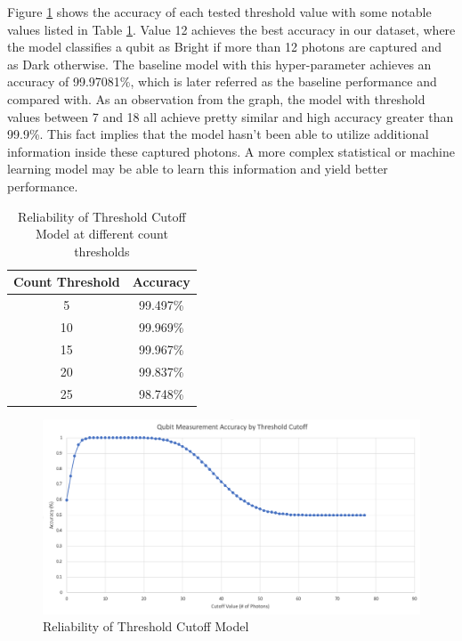 \documentclass[letterpaper,twocolumn,10pt]{article}
\begin{document}
Figure \ref{fig:threshold_cutoff} shows the accuracy of each tested threshold value with some notable values listed in Table \ref{table:threshold_cutoff}. Value 12 achieves the best accuracy in our dataset, where the model classifies a qubit as Bright if more than 12 photons are captured and as Dark otherwise. The baseline model with this hyper-parameter achieves an accuracy of 99.97081\%, which is later referred as the baseline performance and compared with. As an observation from the graph, the model with threshold values between 7 and 18 all achieve pretty similar and high accuracy greater than 99.9\%. This fact implies that the model hasn't been able to utilize additional information inside these captured photons. A more complex statistical or machine learning model may be able to learn this information and yield better performance. 

\begin{table}
    \caption{Reliability of Threshold Cutoff Model at different count thresholds}
    \begin{center}
        \begin{tabular}{c c}
            Count Threshold & Accuracy \\ [0.5ex] 
            \hline
            5 & 99.497\% \\ 
            10 & 99.969\% \\
            15 & 99.967\% \\
            20 & 99.837\% \\
            25 & 98.748\% \\
       \end{tabular}
    \end{center}
    \label{table:threshold_cutoff}  
\end{table}


\begin{figure}
    \includegraphics[width=\linewidth]{Figures/threshold_cutoff_accuracy.png}
    \centering
    \caption{Reliability of Threshold Cutoff Model}
    \label{fig:threshold_cutoff}
\end{figure}
\end{document}
